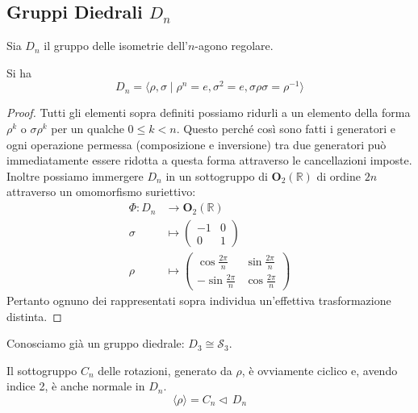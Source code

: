 \subsection{Gruppi Diedrali  $ D_n $}
\begin{multicols}{2}
\begin{definition}
	Sia $ D_n $ il gruppo delle isometrie dell'$ n $-agono regolare.
\end{definition}
\begin{theorem}[Caratterizzazione di $ D_n $]
	Si ha \[ D_n = \langle \rho, \sigma \mid \rho ^n = e, \sigma^2 = e, \sigma \rho \sigma = \rho^{-1} \rangle \]
\end{theorem}
\begin{proof}
	Tutti gli elementi sopra definiti possiamo ridurli a un elemento della forma $ \rho^k $ o $ \sigma \rho^k $ per un qualche $ 0 \leq k < n $. Questo perché così sono fatti i generatori e ogni operazione permessa (composizione e inversione) tra due generatori può immediatamente essere ridotta a questa forma attraverso le cancellazioni imposte. Inoltre possiamo immergere $ D_n $ in un sottogruppo di $ \mathbf{O}_2(\mathbb{R}) $ di ordine $ 2n $ attraverso un omomorfismo suriettivo: \begin{align*}
	\Phi \colon D_n &\to \mathbf{O}_2(\mathbb{R}) \\
	\sigma &\mapsto \left(\begin{matrix}
	-1 & 0 \\
	0 & 1
	\end{matrix}\right) \\
	\rho &\mapsto \left(\begin{matrix}
	\cos\frac{2\pi}{n} & \sin\frac{2\pi}{n} \\
	-\sin\frac{2\pi}{n} & \cos\frac{2\pi}{n}
	\end{matrix}\right) 
	\end{align*}
	Pertanto ognuno dei rappresentati sopra individua un'effettiva trasformazione distinta.
\end{proof}

\begin{remark}
	Conosciamo già un gruppo diedrale: $ D_3 \cong \mathcal{S}_3 $.
\end{remark}
\begin{remark}
	Il sottogruppo $ C_n $ delle rotazioni, generato da $ \rho $, è ovviamente ciclico e, avendo indice 2, è anche normale in $ D_n $. $$ \langle \rho \rangle = C_n \lhd\, D_n $$
\end{remark}


\end{multicols}
